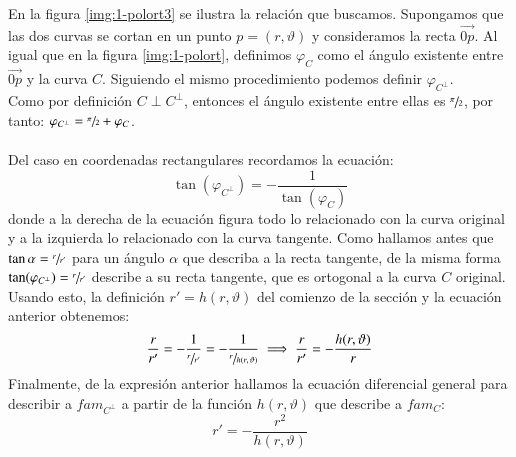 En la figura \ref{img:1-polort3} se ilustra la relación que buscamos. Supongamos que las dos curvas se cortan en un punto $p = (r, \vartheta)$ y consideramos la recta $\vec{0p}$. Al igual que en la figura \ref{img:1-polort}, definimos $\varphi_C$ como el ángulo existente entre $\vec{0p}$ y la curva $C$. Siguiendo el mismo procedimiento podemos definir $\varphi_{C^\perp}$.\\
Como por definición $C \perp C^{\perp}$, entonces el ángulo existente entre ellas es $\sfrac{\pi}{2}$, por tanto: $\varphi_{C^\perp} = \sfrac{\pi}{2} + \varphi_C$.\\\\
Del caso en coordenadas rectangulares recordamos la ecuación:
$$
\tan(\varphi_{C^\perp}) = -\frac{1}{ \tan(\varphi_C)}
$$
donde a la derecha de la ecuación figura todo lo relacionado con la curva original y a la izquierda lo relacionado con la curva tangente. Como hallamos antes que $\tan\alpha = \sfrac{r}{r'}$ para un ángulo $\alpha$ que describa a la recta tangente, de la misma forma $\tan(\varphi_{C^\perp}) = \sfrac{r}{r'}$ describe a su recta tangente, que es ortogonal a la curva $C$ original.\\ Usando esto, la definición $r' = h(r, \vartheta)$ del comienzo de la sección y la ecuación anterior obtenemos:
$$
\frac{r}{r'} = -\frac{1}{\sfrac{r}{r'}} = -\frac{1}{\sfrac{r}{h(r,\vartheta)}} \implies \frac{r}{r'} = -\frac{h(r,\vartheta)}{r}
$$
Finalmente, de la expresión anterior hallamos la ecuación diferencial general para describir a $fam_{C^\perp}$ a partir de la función $h(r, \vartheta)$ que describe a $fam_C$:
$$
    r' = -\frac{r^2}{h(r, \vartheta)}
$$
